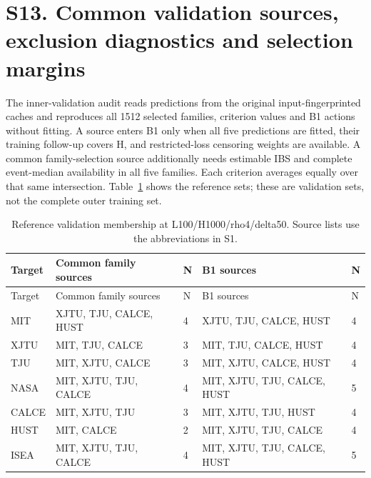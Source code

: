 \documentclass[10pt,a4paper]{article}
\begin{document}
\section*{S13. Common validation sources, exclusion diagnostics and selection margins}
The inner-validation audit reads predictions from the original input-fingerprinted caches and reproduces all 1512 selected families, criterion values and B1 actions without fitting. A source enters B1 only when all five predictions are fitted, their training follow-up covers H, and restricted-loss censoring weights are available. A common family-selection source additionally needs estimable IBS and complete event-median availability in all five families. Each criterion averages equally over that same intersection. Table~\ref{tab:selection_support} shows the reference sets; these are validation sets, not the complete outer training set.
{\scriptsize
\begin{longtable}{@{\extracolsep{\fill}}lllll}
\caption{Reference validation membership at L100/H1000/rho4/delta50. Source lists use the abbreviations in S1.}\label{tab:selection_support}\\
\toprule
Target & Common family sources & N & B1 sources & N\\\midrule
\endfirsthead
\toprule
Target & Common family sources & N & B1 sources & N\\\midrule
\endhead
\bottomrule\endfoot
MIT & XJTU, TJU, CALCE, HUST & 4 & XJTU, TJU, CALCE, HUST & 4\\
XJTU & MIT, TJU, CALCE & 3 & MIT, TJU, CALCE, HUST & 4\\
TJU & MIT, XJTU, CALCE & 3 & MIT, XJTU, CALCE, HUST & 4\\
NASA & MIT, XJTU, TJU, CALCE & 4 & MIT, XJTU, TJU, CALCE, HUST & 5\\
CALCE & MIT, XJTU, TJU & 3 & MIT, XJTU, TJU, HUST & 4\\
HUST & MIT, CALCE & 2 & MIT, XJTU, TJU, CALCE & 4\\
ISEA & MIT, XJTU, TJU, CALCE & 4 & MIT, XJTU, TJU, CALCE, HUST & 5\\
\end{longtable}}
\end{document}
